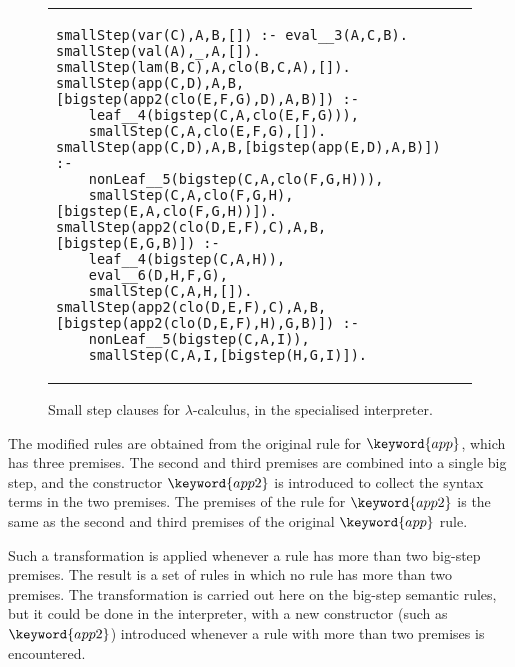 \begin{figure}
\begin{tabular}{l}
\begin{lstlisting}
smallStep(var(C),A,B,[]) :- eval__3(A,C,B).
smallStep(val(A),_,A,[]).
smallStep(lam(B,C),A,clo(B,C,A),[]).
smallStep(app(C,D),A,B,[bigstep(app2(clo(E,F,G),D),A,B)]) :-
    leaf__4(bigstep(C,A,clo(E,F,G))),
    smallStep(C,A,clo(E,F,G),[]).
smallStep(app(C,D),A,B,[bigstep(app(E,D),A,B)]) :-
    nonLeaf__5(bigstep(C,A,clo(F,G,H))),
    smallStep(C,A,clo(F,G,H),[bigstep(E,A,clo(F,G,H))]).
smallStep(app2(clo(D,E,F),C),A,B,[bigstep(E,G,B)]) :-
    leaf__4(bigstep(C,A,H)),
    eval__6(D,H,F,G),
    smallStep(C,A,H,[]).
smallStep(app2(clo(D,E,F),C),A,B,[bigstep(app2(clo(D,E,F),H),G,B)]) :-
    nonLeaf__5(bigstep(C,A,I)),
    smallStep(C,A,I,[bigstep(H,G,I)]).
\end{lstlisting}
\end{tabular}
\caption{Small step clauses for $\lambda$-calculus, in the specialised interpreter.}\label{small-step-lambda}
\end{figure}

The modified rules are obtained from the original rule for $\keyword{app}$, which has three premises.  
The second and third premises are combined into a single big step, and the constructor $\keyword{app2}$
is introduced to collect the syntax terms in the two premises.  The premises of the rule for $\keyword{app2}$ 
is the same as the second and third premises of the original $\keyword{app}$ rule.

Such a transformation is applied whenever a rule has more than two big-step premises.  The result is
a set of rules in which no rule has more than two premises.  The transformation is carried out here on
the big-step semantic rules, but it could be done in the interpreter, with a new constructor (such as $\keyword{app2}$)
introduced whenever a rule with more than two premises is encountered.

